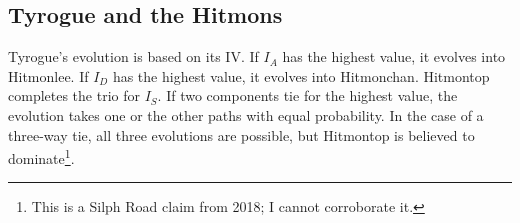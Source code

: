 \subsection{Tyrogue and the Hitmons\label{subsec:tyrogue}}
Tyrogue's evolution is based on its IV\@.
If $I_A$ has the highest value, it evolves into Hitmonlee.
If $I_D$ has the highest value, it evolves into Hitmonchan.
Hitmontop completes the trio for $I_S$.
If two components tie for the highest value, the evolution takes one or the other
 paths with equal probability.
In the case of a three-way tie, all three evolutions are possible, but Hitmontop is believed to
 dominate\footnote{This is a Silph Road claim from 2018; I cannot corroborate it.}.
